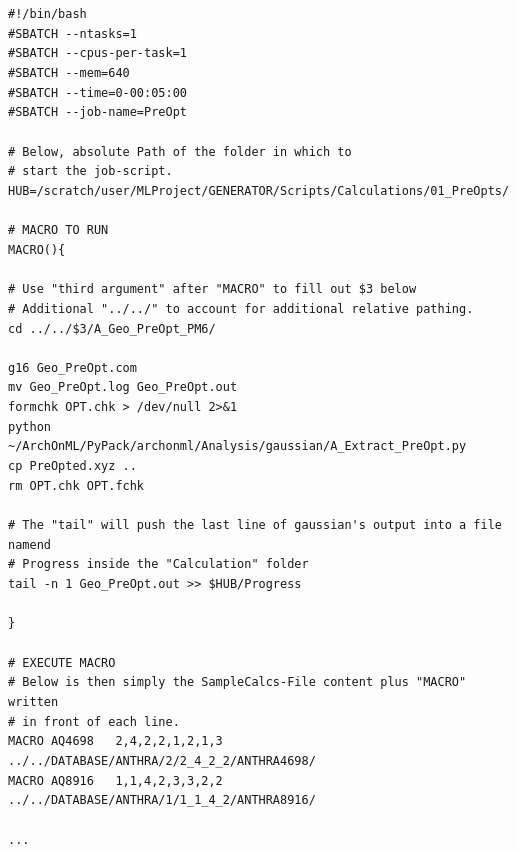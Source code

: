 \documentclass[12pt]{achemso}
\begin{document}
\noindent\verb+#!/bin/bash+\\[-0.7em]
\verb+#SBATCH --ntasks=1+\\[-0.7em]
\verb+#SBATCH --cpus-per-task=1+\\[-0.7em]
\verb+#SBATCH --mem=640+\\[-0.7em]
\verb+#SBATCH --time=0-00:05:00+\\[-0.7em]
\verb+#SBATCH --job-name=PreOpt+\\[-0.7em]
\verb++\\[-0.7em]
\verb+# Below, absolute Path of the folder in which to+\\[-0.7em]
\verb+# start the job-script.+\\[-0.7em]
\verb+HUB=/scratch/user/MLProject/GENERATOR/Scripts/Calculations/01_PreOpts/+\\[-0.7em]
\verb++\\[-0.7em]
\verb+# MACRO TO RUN+\\[-0.7em]
\verb+MACRO(){+\\[-0.7em]
\verb++\\[-0.7em]
\verb+# Use "third argument" after "MACRO" to fill out $3 below+\\[-0.7em]
\verb+# Additional "../../" to account for additional relative pathing.+\\[-0.7em]
\verb+cd ../../$3/A_Geo_PreOpt_PM6/+\\[-0.7em]
\verb++\\[-0.7em]
\verb+g16 Geo_PreOpt.com+\\[-0.7em]
\verb+mv Geo_PreOpt.log Geo_PreOpt.out+\\[-0.7em]
\verb+formchk OPT.chk > /dev/null 2>&1+\\[-0.7em]
\verb+python ~/ArchOnML/PyPack/archonml/Analysis/gaussian/A_Extract_PreOpt.py+\\[-0.7em]
\verb+cp PreOpted.xyz ..+\\[-0.7em]
\verb+rm OPT.chk OPT.fchk+\\[-0.7em]
\verb++\\[-0.7em]
\verb+# The "tail" will push the last line of gaussian's output into a file namend+\\[-0.7em]
\verb+# Progress inside the "Calculation" folder+\\[-0.7em]
\verb+tail -n 1 Geo_PreOpt.out >> $HUB/Progress+\\[-0.7em]
\verb++\\[-0.7em]
\verb+}+\\[-0.7em]
\verb++\\[-0.7em]
\verb+# EXECUTE MACRO +\\[-0.7em]
\verb+# Below is then simply the SampleCalcs-File content plus "MACRO" written+\\[-0.7em]
\verb+# in front of each line.+\\[-0.7em]
\verb+MACRO AQ4698   2,4,2,2,1,2,1,3   ../../DATABASE/ANTHRA/2/2_4_2_2/ANTHRA4698/+\\[-0.7em]
\verb+MACRO AQ8916   1,1,4,2,3,3,2,2   ../../DATABASE/ANTHRA/1/1_1_4_2/ANTHRA8916/+\\[-0.7em]
\verb++\\[-0.7em]
\verb+...+\\[-0.7em]
\end{document}
